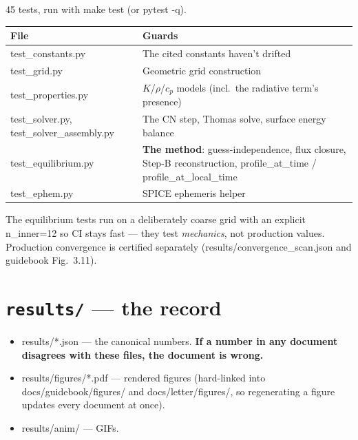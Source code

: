 \documentclass[11pt]{article}
\newcommand{\code}[1]{{\ttfamily\small #1}}
\begin{document}
45 tests, run with \code{make test} (or \code{pytest -q}).

\begin{center}\small
\begin{tabularx}{\textwidth}{@{}>{\ttfamily\small}l X@{}}
\toprule
\textnormal{\textbf{File}} & \textbf{Guards} \\
\midrule
test\_constants.py & The cited constants haven't drifted \\
test\_grid.py & Geometric grid construction \\
test\_properties.py & $K$/$\rho$/$c_p$ models (incl.\ the radiative term's presence) \\
test\_solver.py, test\_solver\_assembly.py & The CN step, Thomas solve, surface energy balance \\
test\_equilibrium.py & \textnormal{\textbf{The method}}: guess-independence, flux closure, Step-B reconstruction, \code{profile\_at\_time} / \code{profile\_at\_local\_time} \\
test\_ephem.py & SPICE ephemeris helper \\
\bottomrule
\end{tabularx}
\end{center}

\noindent The equilibrium tests run on a deliberately coarse grid with an
explicit \code{n\_inner=12} so CI stays fast --- they test \emph{mechanics},
not production values. Production convergence is certified separately
(\code{results/convergence\_scan.json} and guidebook Fig.~3.11).

\section{\texttt{results/} --- the record}

\begin{itemize}[leftmargin=1.4em, itemsep=2pt]
\item \code{results/*.json} --- the canonical numbers. \textbf{If a number in
  any document disagrees with these files, the document is wrong.}
\item \code{results/figures/*.pdf} --- rendered figures (hard-linked into
  \code{docs/guidebook/figures/} and \code{docs/letter/figures/}, so
  regenerating a figure updates every document at once).
\item \code{results/anim/} --- GIFs.
\end{itemize}
\end{document}
